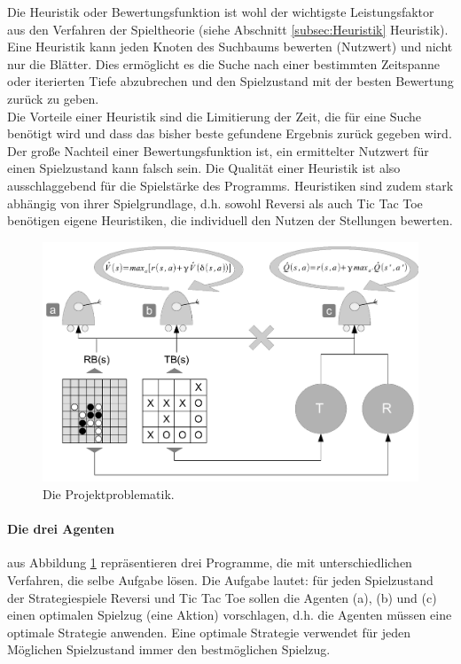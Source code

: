 Die Heuristik oder Bewertungsfunktion ist wohl der wichtigste Leistungsfaktor aus den Verfahren der Spieltheorie (siehe Abschnitt \ref{subsec:Heuristik} Heuristik). Eine Heuristik kann jeden Knoten des Suchbaums bewerten (Nutzwert) und nicht nur die Blätter. Dies ermöglicht es die Suche nach einer bestimmten Zeitspanne oder iterierten Tiefe abzubrechen und den Spielzustand mit der besten Bewertung zurück zu geben. \\

Die Vorteile einer Heuristik sind die Limitierung der Zeit, die für eine Suche benötigt wird und dass das bisher beste gefundene Ergebnis zurück gegeben wird. Der große Nachteil einer Bewertungsfunktion ist, ein ermittelter Nutzwert für einen Spielzustand kann falsch sein. Die Qualität einer Heuristik ist also ausschlaggebend für die Spielstärke des Programms. Heuristiken sind zudem stark abhängig von ihrer Spielgrundlage, d.h. sowohl Reversi als auch Tic Tac Toe benötigen eigene Heuristiken, die individuell den Nutzen der Stellungen bewerten. \\

\begin{figure}[!htbp]
  \centering
  \includegraphics[scale = 0.6]{inhalt/abbildungen/drei_agenten.pdf}
  \caption{Die Projektproblematik.}
  \label{fig:drei_agenten}
\end{figure} 

\paragraph{Die drei Agenten} aus Abbildung \ref{fig:drei_agenten} repräsentieren drei Programme, die mit unterschiedlichen Verfahren, die selbe Aufgabe lösen. Die Aufgabe lautet: für jeden Spielzustand der Strategiespiele Reversi und Tic Tac Toe sollen die Agenten (a), (b) und (c) einen optimalen Spielzug (eine Aktion) vorschlagen, d.h. die Agenten müssen eine optimale Strategie anwenden. Eine optimale Strategie verwendet für jeden Möglichen Spielzustand immer den bestmöglichen Spielzug. \\

